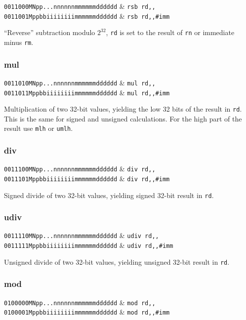 \decfmt
\texttt{0011000MNpp...nnnnnnmmmmmmdddddd} & \texttt{rsb rd,,} \\
\texttt{0011001Mppbbiiiiiiiimmmmmmdddddd} & \texttt{rsb rd,,\#imm}
\finfmt

``Reverse'' subtraction modulo $2^{32}$, \texttt{rd} is set to the result of \texttt{rn} or immediate minus \texttt{rm}.

\subsubsection{mul}

\decfmt
\texttt{0011010MNpp...nnnnnnmmmmmmdddddd} & \texttt{mul rd,,} \\
\texttt{0011011Mppbbiiiiiiiimmmmmmdddddd} & \texttt{mul rd,,\#imm}
\finfmt

Multiplication of two 32-bit values, yielding the low 32 bits of the result in \texttt{rd}. This is the same for signed and unsigned calculations. For the high part of the result use \texttt{mlh} or \texttt{umlh}.

\subsubsection{div}

\decfmt
\texttt{0011100MNpp...nnnnnnmmmmmmdddddd} & \texttt{div rd,,} \\
\texttt{0011101Mppbbiiiiiiiimmmmmmdddddd} & \texttt{div rd,,\#imm}
\finfmt

Signed divide of two 32-bit values, yielding signed 32-bit result in \texttt{rd}.

\subsubsection{udiv}

\decfmt
\texttt{0011110MNpp...nnnnnnmmmmmmdddddd} & \texttt{udiv rd,,} \\
\texttt{0011111Mppbbiiiiiiiimmmmmmdddddd} & \texttt{udiv rd,,\#imm}
\finfmt

Unsigned divide of two 32-bit values, yielding unsigned 32-bit result in \texttt{rd}.

\subsubsection{mod}

\decfmt
\texttt{0100000MNpp...nnnnnnmmmmmmdddddd} & \texttt{mod rd,,} \\
\texttt{0100001Mppbbiiiiiiiimmmmmmdddddd} & \texttt{mod rd,,\#imm}
\finfmt

